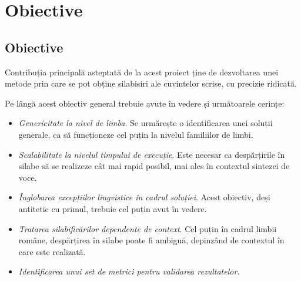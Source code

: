 \chapter{Obiective}
\label{cap:obiective-specificatii}
\section{Obiective}
Contribuția principală asteptată de la acest proiect ține de dezvoltarea unei metode prin care se pot obține silabisiri ale cuvintelor scrise, cu precizie ridicată. 

Pe lângă acest obiectiv general trebuie avute în vedere și următoarele cerințe: 

\begin{itemize}
\item \textit{Genericitate la nivel de limba}. Se urmărește o identificarea unei soluții generale, ca să funcționeze cel puțin la nivelul familiilor de limbi.
\item \textit{Scalabilitate la nivelul timpului de execuție}. Este necesar ca despărțirile în silabe să se realizeze cât mai rapid posibil, mai ales în contextul sintezei de voce. 
\item \textit{Înglobarea excepțiilor lingvistice în cadrul soluției}. Acest obiectiv, deși antitetic cu primul, trebuie cel puțin avut în vedere.
\item \textit{Tratarea silabificărilor dependente de context}. Cel puțin în cadrul limbii române, despărțirea în silabe poate fi ambiguă, depinzând de contextul în care este realizată.
\item \textit{Identificarea unui set de metrici pentru validarea rezultatelor.}

\end{itemize}
